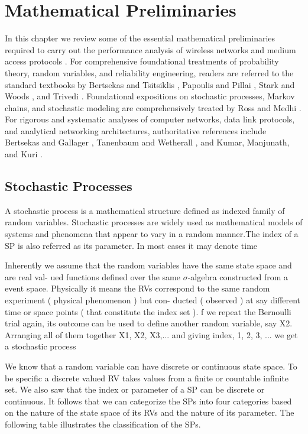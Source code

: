 \chapter{Mathematical Preliminaries}
In this chapter we review some of the essential mathematical preliminaries required to carry out the performance analysis of wireless networks and medium access protocols \cite{EE6150_notes}. For comprehensive foundational treatments of probability theory, random variables, and reliability engineering, readers are referred to the standard textbooks by Bertsekas and Tsitsiklis \cite{bertsekas2008introduction}, Papoulis and Pillai \cite{papoulis2002probability}, Stark and Woods \cite{stark2011probability}, and Trivedi \cite{trivedi2002probability}. Foundational expositions on stochastic processes, Markov chains, and stochastic modeling are comprehensively treated by Ross \cite{ross1996stochastic, ross2019introduction} and Medhi \cite{medhi1994stochastic}. For rigorous and systematic analyses of computer networks, data link protocols, and analytical networking architectures, authoritative references include Bertsekas and Gallager \cite{bertsekas1992data}, Tanenbaum and Wetherall \cite{tanenbaum2011computer}, and Kumar, Manjunath, and Kuri \cite{kumar2004communication, kumar2008wireless}.


\section{Stochastic Processes}
A stochastic process is a mathematical structure defined as indexed family of random variables.
Stochastic processes are widely used as mathematical models of systems and phenomena that
appear to vary in a random manner.The index of a SP is also referred as its parameter. In most cases it may denote time

Inherently we assume that the random variables have the same state space and are real val-
ued functions defined over the same $\sigma$-algebra constructed from a event space. Physically it
means the RVs correspond to the same random experiment ( physical phenomenon ) but con-
ducted ( observed ) at say different time or space points ( that constitute the index set ). f we repeat the Bernoulli trial again, its outcome can be used to define another random
variable, say X2. Arranging all of them together X1, X2, X3,... and giving index, {1, 2, 3, ...}
we get a stochastic process

We know that a random variable can have discrete or continuous state space. To be specific a discrete valued RV takes values from a finite or countable infinite set. We also saw that the index or parameter of a SP can be discrete or continuous. It follows that we can categorize the SPs into four categories based on the nature of the state space of its RVs and the nature of its parameter. The following table illustrates the classification of the SPs.
 
